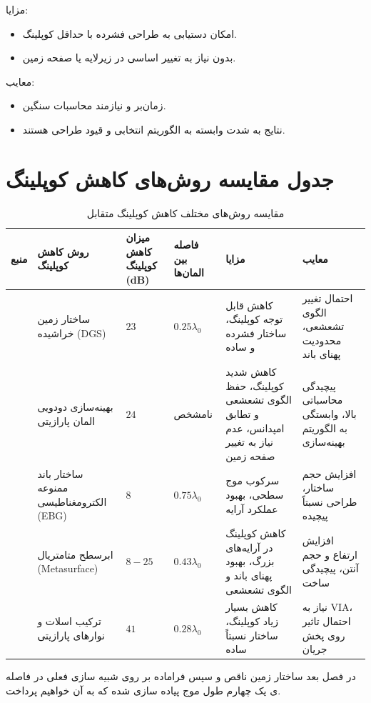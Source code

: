 مزایا:
\begin{itemize}
	\item {
		امکان دستیابی به طراحی فشرده با حداقل کوپلینگ.
	}
	\item {
	بدون نیاز به تغییر اساسی در زیرلایه یا صفحه زمین.
	}
\end{itemize}
معایب:
\begin{itemize}
	\item {
	زمان‌بر و نیازمند محاسبات سنگین.
	}
	\item{
	نتایج به شدت وابسته به الگوریتم انتخابی و قیود طراحی هستند.
	}
\end{itemize}


\section*{\textsf{جدول مقایسه روش‌های کاهش کوپلینگ}}

\begin{table}[h!]
\centering
\scriptsize
\renewcommand{\arraystretch}{1.3}
\begin{tabular}{|>{\RaggedLeft\arraybackslash}p{2cm}|>{\arraybackslash}p{2.2cm}|>{\centering\arraybackslash}p{1.3cm}|>{\centering\arraybackslash}p{1.5cm}|>{\arraybackslash}p{2.8cm}|>{\arraybackslash}p{2.8cm}|}
\hline
\textbf{منبع} & \textbf{روش کاهش کوپلینگ} & \textbf{میزان کاهش کوپلینگ (dB)} & \textbf{فاصله بین المان‌ها} & \textbf{مزایا} & \textbf{معایب} \\
\hline
\cite{hajilou2012mutual} & ساختار زمین خراشیده (DGS) & $23$ & $0.25\lambda_0$ & کاهش قابل توجه کوپلینگ، ساختار فشرده و ساده & احتمال تغییر الگوی تشعشعی، محدودیت پهنای باند \\
\hline
\cite{ghadimi2020systematic} & بهینه‌سازی دودویی المان پارازیتی & $24$ & نامشخص & کاهش شدید کوپلینگ، حفظ الگوی تشعشعی و تطابق امپدانس، عدم نیاز به تغییر صفحه زمین & پیچیدگی محاسباتی بالا، وابستگی به الگوریتم بهینه‌سازی \\
\hline
\cite{yang2003microstrip} & ساختار باند ممنوعه الکترومغناطیسی (EBG) & $8$ & $0.75\lambda_0$ & سرکوب موج سطحی، بهبود عملکرد آرایه & افزایش حجم ساختار، طراحی نسبتاً پیچیده \\
\hline
\cite{tang2020metasurface} & ابرسطح متامتریال (Metasurface) & $8-25$ & $0.43\lambda_0$ & کاهش کوپلینگ در آرایه‌های بزرگ، بهبود پهنای باند و الگوی تشعشعی & افزایش ارتفاع و حجم آنتن، پیچیدگی ساخت \\
\hline
\cite{emadeddin2017high} & ترکیب اسلات و نوارهای پارازیتی & $41$ & $0.28\lambda_0$ & کاهش بسیار زیاد کوپلینگ، ساختار نسبتاً ساده & نیاز به VIA، احتمال تاثیر روی پخش جریان \\
\hline
\end{tabular}
\caption{مقایسه روش‌های مختلف کاهش کوپلینگ متقابل}
\label{tab:coupling_methods}
\end{table}


در فصل بعد ساختار زمین ناقص
 و سپس فراماده
  بر روی شبیه سازی فعلی در فاصله ی یک چهارم طول موج پیاده سازی شده که به آن خواهیم پرداخت.













